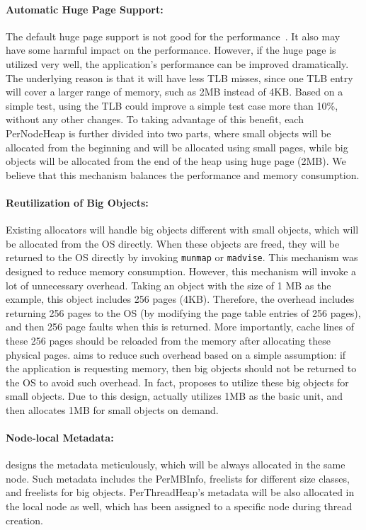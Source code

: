 \paragraph{Automatic Huge Page Support:} The default huge page support is not good for the performance~\cite{}. It also may have some harmful impact on the performance. However, if the huge page is utilized very well, the application's performance can be improved dramatically. The underlying reason is that it will have less TLB misses, since one TLB entry will cover a larger range of memory, such as 2MB instead of 4KB. Based on a simple test, using the TLB could improve a simple test case more than 10\%, without any other changes. To taking advantage of this benefit, each PerNodeHeap is further divided into two parts, where small objects will be allocated from the beginning and will be allocated using small pages, while big objects will be allocated from the end of the heap using huge page (2MB). We believe that this mechanism balances the performance and memory consumption.   

\paragraph{Reutilization of Big Objects:} Existing allocators will handle big objects different with small objects, which will be allocated from the OS directly. When these objects are freed, they will be returned to the OS directly by invoking \texttt{munmap} or \texttt{madvise}. This mechanism was designed to reduce memory consumption. However, this mechanism will invoke a lot of unnecessary overhead. Taking an object with the size of 1 MB as the example, this object includes 256 pages (4KB). Therefore, the overhead includes returning 256 pages to the OS (by modifying the page table entries of 256 pages), and then 256 page faults when this is returned. More importantly, cache lines of these 256 pages should be reloaded from the memory after allocating these physical pages. \NM{} aims to reduce such overhead based on a simple assumption: if the application is requesting memory, then big objects should not be returned to the OS to avoid such overhead. In fact, \NM{} proposes to utilize these big objects for small objects. Due to this design, \NM{} actually utilizes 1MB as the basic unit, and then allocates 1MB for small objects on demand. 

\paragraph{Node-local Metadata:} \NM{} designs the metadata meticulously, which will be always allocated in the same node. Such metadata includes the PerMBInfo, freelists for different size classes, and freelists for big objects. PerThreadHeap's metadata will be also allocated in the local node as well, which has been assigned to a specific node during thread creation. 


 